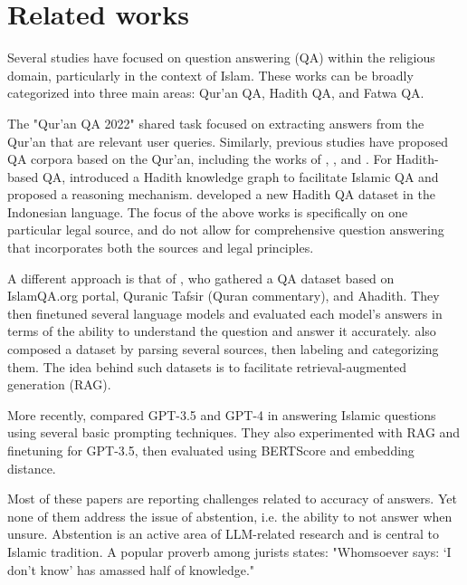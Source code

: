 \documentclass[letterpaper]{article}
\begin{document}
\section{Related works}
Several studies have focused on question answering (QA) within the religious domain, particularly in the context of Islam. These works can be broadly categorized into three main areas: Qur’an QA, Hadith QA, and Fatwa QA.

The "Qur’an QA 2022" shared task \cite{malhas-etal-2023-quran} focused on extracting answers from the Qur’an that are relevant user queries. Similarly, previous studies have proposed QA corpora based on the Qur’an, including the works of \citet{abdelnasser2014bayan}, \citet{malhas2020ayatec}, and \citet{alqahtani2018annotated}. For Hadith-based QA, \citet{wiharja2022questions} introduced a Hadith knowledge graph to facilitate Islamic QA and proposed a reasoning mechanism. \citet{rizqullah2023qasina} developed a new Hadith QA dataset in the Indonesian language. The focus of the above works is specifically on one particular legal source, and do not allow for comprehensive question answering that incorporates both the sources and legal principles.

A different approach is that of \citet{qamar2024benchmark}, who gathered a QA dataset based on IslamQA.org portal, Quranic Tafsir (Quran commentary), and Ahadith. They then finetuned several language models and evaluated each model's answers in terms of the ability to understand the question and answer it accurately. \citet{mohammed2022english} also composed a dataset by parsing several sources, then labeling and categorizing them. The idea behind such datasets is to facilitate retrieval-augmented generation (RAG).

More recently, \citet{patel2023building} compared GPT-3.5 and GPT-4 in answering Islamic questions using several basic prompting techniques. They also experimented with RAG and finetuning for GPT-3.5, then evaluated using BERTScore and embedding distance.

Most of these papers are reporting challenges related to accuracy of answers. Yet none of them address the issue of abstention, i.e. the ability to not answer when unsure. Abstention is an active area of LLM-related research \cite{kasai2023realtime,rottger-etal-2024-xstest,ahdritz2024distinguishing,kim2024epistemology,madhusudhan2024llms} and is central to Islamic tradition. A popular proverb among jurists states: "Whomsoever says: `I don't know' has amassed half of knowledge." %
\end{document}
